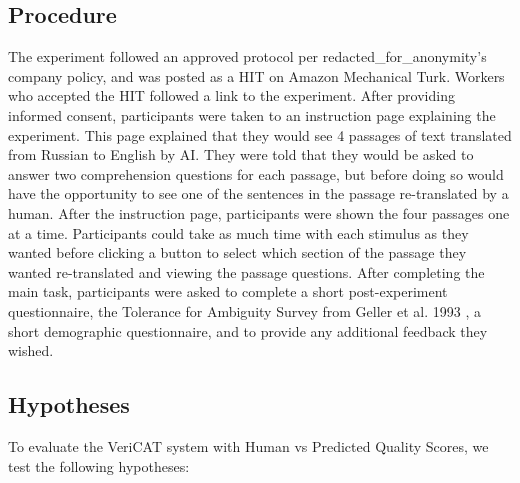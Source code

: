 \subsection{Procedure}

The experiment followed an approved protocol per redacted\_for\_anonymity’s company policy, and was posted as a HIT on Amazon Mechanical Turk. Workers who accepted the HIT followed a link to the experiment. After providing informed consent, participants were taken to an instruction page explaining the experiment. This page explained that they would see 4 passages of text translated from Russian to English by AI. They were told that they would be asked to answer two comprehension questions for each passage, but before doing so would have the opportunity to see one of the sentences in the passage re-translated by a human. After the instruction page, participants were shown the four passages one at a time. Participants could take as much time with each stimulus as they wanted before clicking a button to select which section of the passage they wanted re-translated and viewing the passage questions. After completing the main task, participants were asked to complete a short post-experiment questionnaire, the Tolerance for Ambiguity Survey from Geller et al. 1993 \cite{gellerTolerance1993}, a short demographic questionnaire, and to provide any additional feedback they wished.

\subsection{Hypotheses}


To evaluate the VeriCAT system with Human vs Predicted Quality Scores, we test the following hypotheses:

